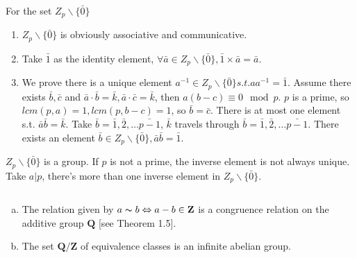 \begin{answer}
    For the set $Z_p\backslash\{\bar{0}\}$
    \begin{enumerate}
        \item $Z_p\backslash\{\bar{0}\}$ is obviously associative and communicative.
        \item Take $\bar{1}$ as the identity element, $\forall \bar{a}\in Z_p\backslash\{\bar{0}\}, \bar{1}\times \bar{a}=\bar{a}$.
        \item We prove there is a unique element $a^{-1}\in Z_p\backslash\{\bar{0}\} s.t. aa^{-1}=\bar{1} $. Assume there exists $\bar{b},\bar{c}$ and $\bar{a}\cdot\bar{b}=\bar{k},\bar{a}\cdot\bar{c}=\bar{k}$, then $a(b-c)\equiv 0\mod{p}$. $p$ is a prime, so $lcm(p,a)=1,  lcm(p,b-c)=1$, so $\bar{b}=\bar{c}$. There is at most one element s.t. $\bar{a}\bar{b}=\bar{k}$. Take $\bar{b}=\bar{1}, \bar{2},\dots\bar{p-1}$, $\bar{k}$ travels through $\bar{b}=\bar{1}, \bar{2},\dots\bar{p-1}$. There exists an element $\bar{b}\in Z_p\backslash\{\bar{0}\}, \bar{a}\bar{b}=\bar{1}$.
    \end{enumerate}
    $Z_p\backslash\{\bar{0}\}$ is a group. If $p$ is not a prime, the inverse element is not always unique. Take $a|p$, there's more than one inverse element in $Z_p\backslash\{\bar{0}\}$.
\end{answer}

$$ $$

\begin{ex}
    \begin{enumerate}[(a)]
        \item The relation given by $a \thicksim b \Leftrightarrow a - b \in \mathbf{Z}$ is a congruence relation on the additive group $\mathbf{Q}$ [see Theorem 1.5].
        \item The set $\mathbf{Q}/\mathbf{Z}$ of equivalence classes is an infinite abelian group.
    \end{enumerate}
\end{ex}

